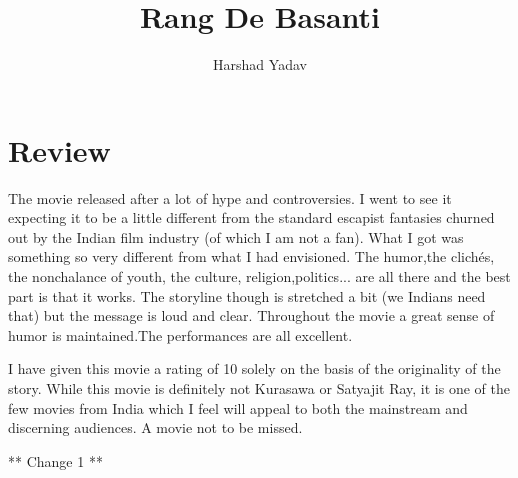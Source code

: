 \documentclass[a4paper,10pt]{article}
\title{Rang De Basanti}
\author{Harshad Yadav}
\begin{document}
\maketitle

\section{Review}
The movie released after a lot of hype and controversies. I went to see it expecting it to be a little different from the standard escapist fantasies churned out by the Indian film industry (of which I am not a fan). What I got was something so very different from what I had envisioned. The humor,the clichés, the nonchalance of youth, the culture, religion,politics... are all there and the best part is that it works. The storyline though is stretched a bit (we Indians need that) but the message is loud and clear. Throughout the movie a great sense of humor is maintained.The performances are all excellent.

I have given this movie a rating of 10 solely on the basis of the originality of the story. While this movie is definitely not Kurasawa or Satyajit Ray, it is one of the few movies from India which I feel will appeal to both the mainstream and discerning audiences. A movie not to be missed. 

** Change 1 **
\end{document}
